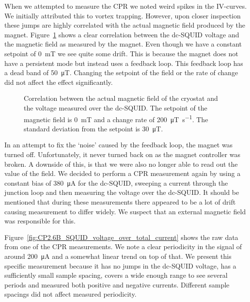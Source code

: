 When we attempted to measure the CPR we noted weird spikes in the IV-curves. We initially attributed this to vortex trapping. However, upon closer inspection these jumps are highly correlated with the actual magnetic field produced by the magnet. Figure~\ref{fig:CP2.6B_PPMS_magnetic_field_drift} shows a clear correlation between the dc-SQUID voltage and the magnetic field as measured by the magnet. Even though we have a constant setpoint of \qty{0}{\milli\tesla} we see quite some drift. This is because the magnet does not have a persistent mode but instead uses a feedback loop. This feedback loop has a dead band of \qty{50}{\micro\tesla}. Changing the setpoint of the field or the rate of change did not affect the effect significantly.

\begin{figure}[ht!]
	\centering
	
	\caption{Correlation between the actual magnetic field of the cryostat and the voltage measured over the dc-SQUID. The setpoint of the magnetic field is \qty{0}{\milli\tesla} and a change rate of \qty{200}{\micro\tesla\per\second}. The standard deviation from the setpoint is \qty{30}{\micro\tesla}.}
	\label{fig:CP2.6B_PPMS_magnetic_field_drift}
\end{figure}

In an attempt to fix the `noise' caused by the feedback loop, the magnet was turned off. Unfortunately, it never turned back on as the magnet controller was broken. A downside of this, is that we were also no longer able to read out the value of the field. We decided to perform a CPR measurement again by using a constant bias of \qty{380}{\micro\ampere} for the dc-SQUID, sweeping a current through the junction loop and then measuring the voltage over the dc-SQUID. It should be mentioned that during these measurements there appeared to be a lot of drift causing measurement to differ widely. We suspect that an external magnetic field was responsible for this. 

Figure~\ref{fig:CP2.6B_SQUID_voltage_over_total_current} shows the raw data from one of the CPR measurements. We note a clear periodicity in the signal of around \qty{200}{\micro\ampere} and a somewhat linear trend on top of that. We present this specific measurement because it has no jumps in the dc-SQUID voltage, has a sufficiently small sample spacing, covers a wide enough range to see several periods and measured both positive and negative currents. Different sample spacings did not affect measured periodicity.

